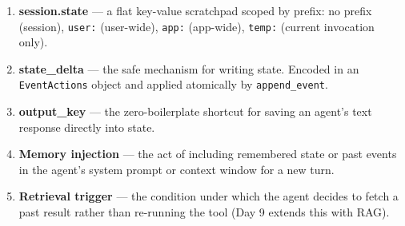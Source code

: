 \documentclass[12pt, a4paper]{article}
\newcommand{\kterm}[1]{\textbf{\textcolor{keyterm}{#1}}}
\begin{document}
\begin{theorybox}
\begin{enumerate}[leftmargin=*, label=\textbf{\arabic*.}, itemsep=4pt]
  \item \kterm{session.state} --- a flat key-value scratchpad scoped by prefix:
    no prefix (session), \texttt{user:} (user-wide), \texttt{app:} (app-wide),
    \texttt{temp:} (current invocation only).

  \item \kterm{state\_delta} --- the safe mechanism for writing state. Encoded in
    an \texttt{EventActions} object and applied atomically by \texttt{append\_event}.

  \item \kterm{output\_key} --- the zero-boilerplate shortcut for saving an agent's
    text response directly into state.

  \item \kterm{Memory injection} --- the act of including remembered state or past
    events in the agent's system prompt or context window for a new turn.

  \item \kterm{Retrieval trigger} --- the condition under which the agent decides
    to fetch a past result rather than re-running the tool (Day 9 extends this with
    RAG).
\end{enumerate}

\end{theorybox}

\vspace{1.5em}
\end{document}
